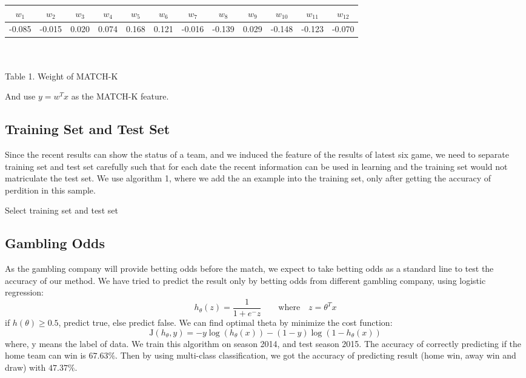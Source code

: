 \documentclass[conference,11pt]{article}
\begin{document}
\begin{center}
\begin{tabular}{|cccccccccccc|}
      \hline
             $w_1$ & $w_2$  & $w_3$ & $w_4$ & $w_5$ & $w_6$ &$w_7$ &$w_8$ &$w_9$ &$w_{10}$&$w_{11}$&$w_{12}$\\
      \hline
            -0.085  & -0.015 & 0.020 & 0.074 & 0.168 & 0.121& -0.016 &-0.139 &0.029 & -0.148 & -0.123 & -0.070\\
      \hline
\end{tabular}\\
\ \\
Table 1. Weight of MATCH-K
\end{center}
And use $y=w^Tx$ as the MATCH-K feature. 

\subsection{Training Set and Test Set}
Since the recent results can show the status of a team, and we induced the feature of the results of latest six game, we need to separate training set and test set carefully such that for each date the recent information  can be used in learning and the training set would not matriculate the test set. We use algorithm 1, where we add the an example into the training  set, only after getting the accuracy of perdition in this sample.
\begin{algorithm}
\caption{Select training set and test set}
\begin{algorithmic}
\ENDFOR
\end{algorithmic}
\end{algorithm}

\subsection{Gambling Odds}
As the gambling company will provide betting odds before the match, we expect to take betting odds as a standard line to test the accuracy of our method. We have tried to predict the result only by betting odds from different gambling company, using logistic regression:
\begin{equation}
h_\theta(z)=\frac{1}{1+e^-z} \qquad \textrm{where} \quad z=\theta^Tx
\end{equation}
if $h(\theta) \geq 0.5$, predict true, else predict false. We can find optimal theta by minimize the cost function:
\begin{equation}
\textrm{J}(h_\theta, y)=-y\log(h_\theta(x))-(1-y)\log(1-h_\theta(x))
\end{equation}
where, y means the label of data. We train this algorithm on season 2014, and test season 2015. The accuracy of correctly predicting if the home team can win is $67.63\%$. Then by using multi-class classification, we got the accuracy of predicting result (home win, away win and draw) with $47.37\%$.
\end{document}

